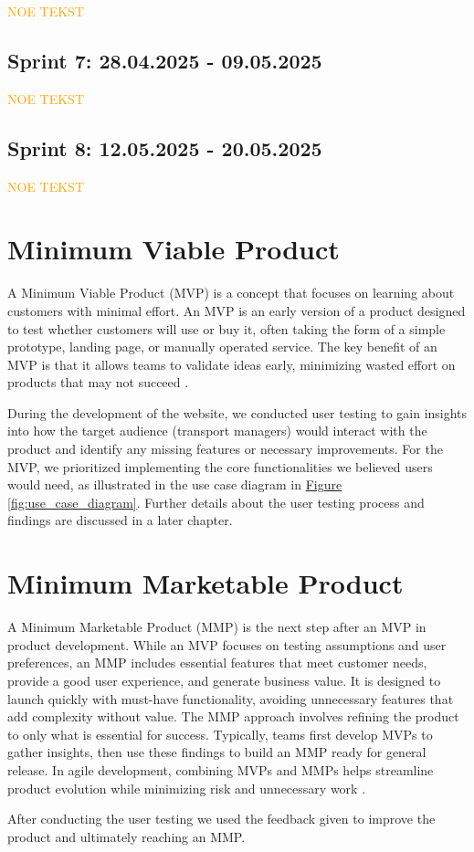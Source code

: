 \textcolor{orange}{NOE TEKST}

\subsection{Sprint 7: 28.04.2025 - 09.05.2025}

\textcolor{orange}{NOE TEKST}

\subsection{Sprint 8: 12.05.2025 - 20.05.2025}

\textcolor{orange}{NOE TEKST}

\section{Minimum Viable Product}

A Minimum Viable Product (MVP) is a concept that focuses on learning about customers with minimal effort. An MVP is an early version of a product designed to test whether customers will use or buy it, often taking the form of a simple prototype, landing page, or manually operated service. The key benefit of an MVP is that it allows teams to validate ideas early, minimizing wasted effort on products that may not succeed \cite{agile_alliance_mvp}. 

During the development of the website, we conducted user testing to gain insights into how the target audience (transport managers) would interact with the product and identify any missing features or necessary improvements. For the MVP, we prioritized implementing the core functionalities we believed users would need, as illustrated in the use case diagram in \hyperref[fig:use_case_diagram]{Figure \ref*{fig:use_case_diagram}}. Further details about the user testing process and findings are discussed in a later chapter.

\section{Minimum Marketable Product}

A Minimum Marketable Product (MMP) is the next step after an MVP in product development. While an MVP focuses on testing assumptions and user preferences, an MMP includes essential features that meet customer needs, provide a good user experience, and generate business value. It is designed to launch quickly with must-have functionality, avoiding unnecessary features that add complexity without value. The MMP approach involves refining the product to only what is essential for success. Typically, teams first develop MVPs to gather insights, then use these findings to build an MMP ready for general release. In agile development, combining MVPs and MMPs helps streamline product evolution while minimizing risk and unnecessary work \cite{wanner_mmp}. 

After conducting the user testing we used the feedback given to improve the product and ultimately reaching an MMP. 
